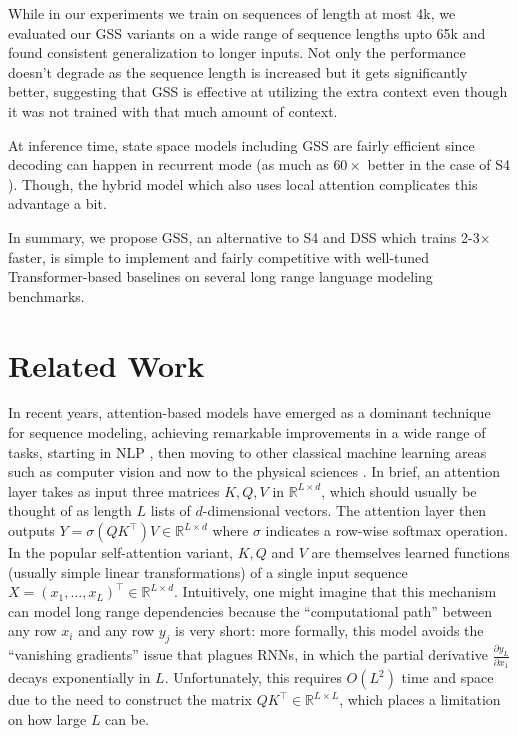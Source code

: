 While in our experiments we train on sequences of length at most 4k, we evaluated our GSS variants on a wide range of sequence lengths upto 65k and found consistent generalization to longer inputs. Not only the performance doesn't degrade as the sequence length is increased but it gets significantly better, suggesting that GSS is effective at utilizing the extra context even though it was not trained with that much amount of context.

At inference time, state space models including GSS are fairly efficient since decoding can happen in recurrent mode (as much as $60\times$ better in the case of S4 \citep{gu2022efficiently}). Though, the hybrid model which also uses local attention complicates this advantage a bit. 

In summary, we propose GSS, an alternative to S4 and \textsc{DSS}  which trains 2-3$\times$ faster, is simple to implement and fairly competitive with well-tuned Transformer-based baselines on several long range language modeling benchmarks.

\section{Related Work}

In recent years, attention-based models have emerged as a dominant technique for sequence modeling, achieving remarkable improvements in a wide range of tasks, starting in NLP \citep{vaswani2017attention, devlin2018bert, radford2019language, liu2019roberta}, then moving to other classical machine learning areas such as computer vision \citep{dosovitskiy2021an_vit} and now to the physical sciences \citep{avsec2021effective, jumper2021highly}. In brief, an attention layer takes as input three matrices $K,Q,V$ in $\mathbb{R}^{L\times d}$, which should usually be thought of as length $L$ lists of $d$-dimensional vectors. The attention layer then outputs $Y=\sigma (Q K^\top )V\in \mathbb{R}^{L\times d}$ where $\sigma$ indicates a row-wise softmax operation. In the popular self-attention variant, $K,Q$ and $V$ are themselves learned functions (usually simple linear transformations) of a single input sequence $X=(x_1,\dots,x_L)^\top \in \mathbb{R}^{L\times d}$. Intuitively, one might imagine that this mechanism can model long range dependencies because the ``computational path'' between any row $x_i$ and any row $y_j$ is very short: more formally, this model avoids the ``vanishing gradients'' issue that plagues RNNs, in which the partial derivative $\frac{\partial y_L}{\partial x_1}$ decays exponentially in $L$. Unfortunately, this requires $O(L^2)$ time and space due to the need to construct the matrix $QK^\top \in \mathbb{R}^{L\times L}$, which places a limitation on how large $L$ can be.

